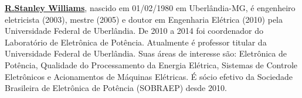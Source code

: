 \documentclass{ceel}
\begin{document}
\begin{multicols}{2}
\noindent \underline{\textbf{R.Stanley Williams}}, nascido em 01/02/1980 em Uberlândia-MG, é engenheiro eletricista (2003), mestre (2005) e doutor em Engenharia Elétrica (2010) pela Universidade Federal de Uberlândia. De 2010 a 2014 foi coordenador do Laboratório de Eletrônica de Potência. Atualmente é professor titular da Universidade Federal de Uberlândia. Suas áreas de interesse são: Eletrônica de Potência, Qualidade do Processamento da Energia Elétrica, Sistemas de Controle Eletrônicos e Acionamentos de Máquinas Elétricas. É sócio efetivo da Sociedade Brasileira de Eletrônica de Potência (SOBRAEP) desde 2010.




\end{multicols}
\end{document}
